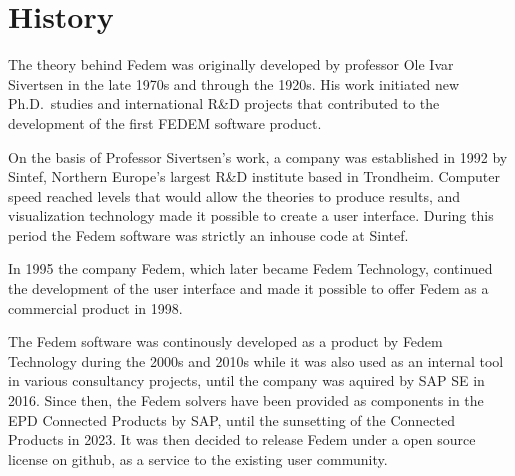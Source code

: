 %
%

%
%

\section{History}

The theory behind Fedem was originally developed by professor Ole Ivar Sivertsen
in the late 1970s and through the 1920s. His work initiated new Ph.D.\ studies
and international R\&D projects that contributed to the development of the first
FEDEM software product.

On the basis of Professor Sivertsen's work, a company was established in 1992
by Sintef, Northern Europe's largest R\&D institute based in Trondheim.
Computer speed reached levels that would allow the theories to produce results,
and visualization technology made it possible to create a user interface.
During this period the Fedem software was strictly an inhouse code at Sintef.

In 1995 the company Fedem, which later became Fedem Technology,
continued the development of the user interface and made it possible to offer
Fedem as a commercial product in 1998.

The Fedem software was continously developed as a product by Fedem Technology
during the 2000s and 2010s while it was also used as an internal tool in
various consultancy projects, until the company was aquired by SAP SE in 2016.
Since then, the Fedem solvers have been provided as components in the
EPD Connected Products by SAP, until the sunsetting of the Connected Products
in 2023. It was then decided to release Fedem under a open source license
on github, as a service to the existing user community.
